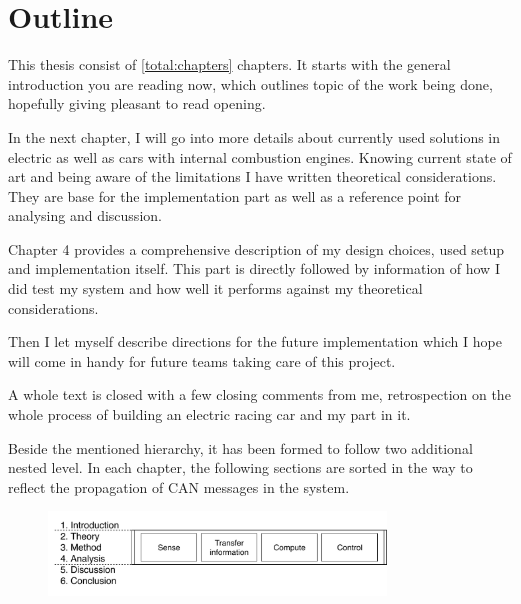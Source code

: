 

\section{Outline}
This thesis consist of \ref{total:chapters} chapters. It starts with the general introduction you are reading now, which outlines topic of the work being done, hopefully giving pleasant to read opening. 

In the next chapter, I will go into more details about currently used solutions in electric as well as cars with internal combustion engines. Knowing current state of art and being aware of the limitations I have written theoretical considerations. They are base for the implementation part as well as a reference point for analysing and discussion.

Chapter 4 provides a comprehensive description of my design choices, used setup and implementation itself. This part is directly followed by information of how I did test my system and how well it performs against my theoretical considerations.

Then I let myself describe directions for the future implementation which I hope will come in handy for future teams taking care of this project.

A whole text is closed with a few closing comments from me, retrospection on the whole process of building an electric racing car and my part in it.

Beside the mentioned hierarchy, it has been formed to follow two additional nested level. In each chapter, the following sections are sorted in the way to reflect the propagation of CAN messages in the system.

\begin{figure}[h]
    \centering
            \includegraphics[width=0.8\textwidth]{figures/Outline}
            \label{outline}
\end{figure}